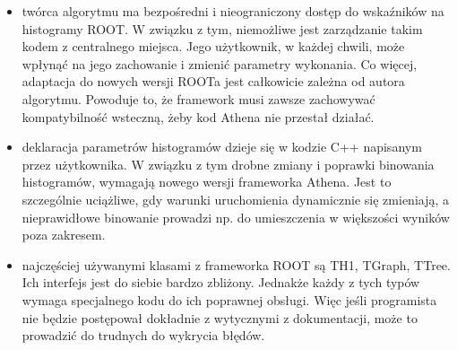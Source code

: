 \begin{itemize}
\item twórca algorytmu ma bezpośredni i nieograniczony dostęp do wskaźników na histogramy ROOT. 
W związku z tym, niemożliwe jest zarządzanie takim kodem z centralnego miejsca.
Jego użytkownik, w każdej chwili, może wpłynąć na jego zachowanie i zmienić parametry wykonania.
Co więcej, adaptacja do nowych wersji ROOTa jest całkowicie zależna od autora algorytmu. Powoduje to, że framework musi zawsze zachowywać kompatybilność wsteczną, żeby kod Athena nie przestał działać.
\item deklaracja parametrów histogramów dzieje się w kodzie C++ napisanym przez użytkownika. 
W związku z tym drobne zmiany i poprawki binowania histogramów, wymagają nowego wersji frameworka Athena. 
Jest to szczególnie uciążliwe, gdy warunki uruchomienia dynamicznie się zmieniają, a nieprawidłowe binowanie prowadzi np. do umieszczenia w większości wyników poza zakresem.
\item najczęściej używanymi klasami z frameworka ROOT są TH1, TGraph, TTree. 
Ich interfejs jest do siebie bardzo zbliżony. 
Jednakże każdy z tych typów wymaga specjalnego kodu do ich poprawnej obsługi. 
Więc jeśli programista nie będzie postępował dokładnie z wytycznymi z dokumentacji, może to prowadzić do trudnych do wykrycia błędów. 
\end{itemize}

